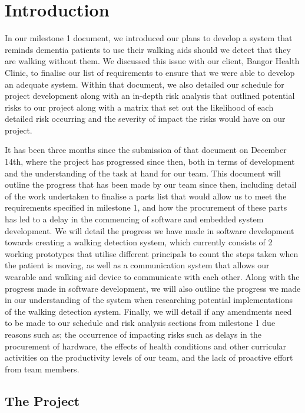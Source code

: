 \chapter{Introduction} 

In our milestone 1 document, we introduced our plans to develop a system that reminds dementia patients to use their walking aids should we detect that they are walking without them. We discussed this issue with our client, Bangor Health Clinic, to finalise our list of requirements to ensure that we were able to develop an adequate system. Within that document, we also detailed our schedule for project development along with an in-depth risk analysis that outlined potential risks to our project along with a matrix that set out the likelihood of each detailed risk occurring and the severity of impact the risks would have on our project.

It has been three months since the submission of that document on December 14th, where the project has progressed since then, both in terms of development and the understanding of the task at hand for our team. This document will outline the progress that has been made by our team since then, including detail of the work undertaken to finalise a parts list that would allow us to meet the requirements specified in milestone 1, and how the procurement of these parts has led to a delay in the commencing of software and embedded system development. We will detail the progress we have made in software development towards creating a walking detection system, which currently consists of 2 working prototypes that utilise different principals to count the steps taken when the patient is moving, as well as a communication system that allows our wearable and walking aid device to communicate with each other. Along with the progress made in software development, we will also outline the progress we  made in our understanding of the system when researching potential implementations of the walking detection system. Finally, we will detail if any amendments need to be made to our schedule and risk analysis sections from milestone 1 due reasons such as; the occurrence of impacting risks such as delays in the procurement of hardware, the effects of health conditions and other curricular activities on the productivity levels of our team, and the lack of proactive effort from team members.

\section{The Project}

